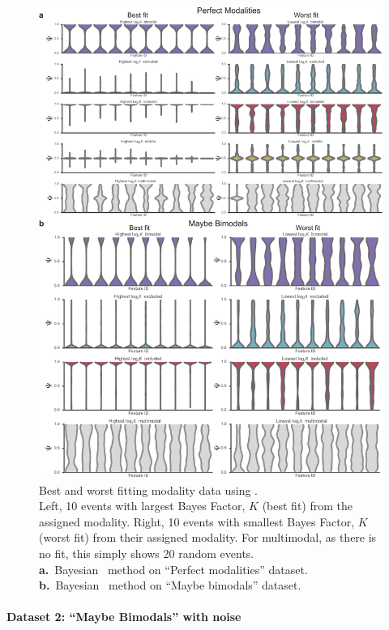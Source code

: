 \begin{figure}
  \centering
  \includegraphics[width=5.8in]{figures/anchor_best_worst}
  \caption[Best and worst fitting modality data using \anchor.]{
  Best and worst fitting modality data using \anchor.\\
Left, 10 events with largest Bayes Factor, $K$ (best fit) from the assigned modality. Right, 10 events with smallest Bayes Factor, $K$ (worst fit) from their assigned modality. For multimodal, as there is no fit, this simply shows 20 random events.\\
\textbf{a.}~Bayesian \anchor\, method on ``Perfect modalities'' dataset.\\
\textbf{b.}~Bayesian \anchor\, method on ``Maybe bimodals'' dataset.
}
\label{fig:anchor_best_worst}
\end{figure}



\paragraph{Dataset 2: ``Maybe Bimodals'' with noise}
\label{sec:anchor_maybe_bimodals}

